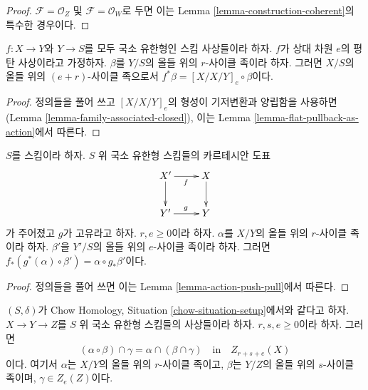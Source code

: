 \begin{proof}
$\mathcal{F} = \mathcal{O}_Z$ 및 $\mathcal{F} = \mathcal{O}_W$로 두면
이는 Lemma \ref{lemma-construction-coherent}의 특수한 경우이다.
\end{proof}

\begin{lemma}
\label{lemma-flat-pullback-as-composition}
$f : X \to Y$와 $Y \to S$를 모두 국소 유한형인 스킴 사상들이라
하자. $f$가 상대 차원 $e$의 평탄 사상이라고 가정하자. $\beta$를
$Y/S$의 올들 위의 $r$-사이클 족이라 하자. 그러면 $X/S$의 올들 위의
$(e + r)$-사이클 족으로서 $f^*\beta = [X/X/Y]_e \circ \beta$이다.
\end{lemma}

\begin{proof}
정의들을 풀어 쓰고 $[X/X/Y]_e$의 형성이 기저변환과 양립함을
사용하면(Lemma \ref{lemma-family-associated-closed}), 이는 Lemma
\ref{lemma-flat-pullback-as-action}에서 따른다.
\end{proof}

\begin{lemma}
\label{lemma-construction-push-pull}
$S$를 스킴이라 하자. $S$ 위 국소 유한형 스킴들의 카르테시안 도표
$$
\xymatrix{
X' \ar[r]_f \ar[d] & X \ar[d] \\
Y' \ar[r]^g & Y
}
$$
가 주어졌고 $g$가 고유라고 하자. $r, e \geq 0$이라 하자. $\alpha$를
$X/Y$의 올들 위의 $r$-사이클 족이라 하자. $\beta'$을 $Y'/S$의
올들 위의 $e$-사이클 족이라 하자. 그러면
$f_*(g^*(\alpha) \circ \beta') = \alpha \circ g_*\beta'$이다.
\end{lemma}

\begin{proof}
정의들을 풀어 쓰면 이는 Lemma \ref{lemma-action-push-pull}에서 따른다.
\end{proof}

\begin{lemma}
\label{lemma-construction-composition}
$(S, \delta)$가 Chow Homology, Situation
\ref{chow-situation-setup}에서와 같다고 하자. $X \to Y \to Z$를 $S$ 위
국소 유한형 스킴들의 사상들이라 하자. $r, s, e \geq 0$이라 하자.
그러면
$$
(\alpha \circ \beta) \cap \gamma = \alpha \cap (\beta \cap \gamma)
\quad\text{in}\quad Z_{r + s + e}(X)
$$
이다. 여기서 $\alpha$는 $X/Y$의 올들 위의 $r$-사이클 족이고,
$\beta$는 $Y/Z$의 올들 위의 $s$-사이클 족이며,
$\gamma \in Z_e(Z)$이다.
\end{lemma}

